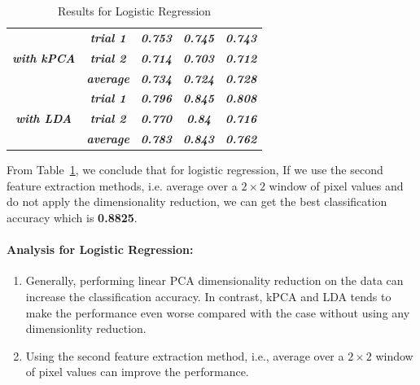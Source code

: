 \documentclass{article}
\begin{document}
\begin{table}[!htb]
\begin{tabular}{|c|c|ccc|}
\textit{\textbf{}}                                                                             & \textit{\textbf{trial 1}} & \multicolumn{1}{c|}{\textit{\textbf{0.753}}} & \multicolumn{1}{c|}{\textit{\textbf{0.745}}}  & \textit{\textbf{0.743}}  \\ \cline{2-5} 
\textit{\textbf{with kPCA}}                                                                    & \textit{\textbf{trial 2}} & \multicolumn{1}{c|}{\textit{\textbf{0.714}}} & \multicolumn{1}{c|}{\textit{\textbf{0.703}}}  & \textit{\textbf{0.712}}  \\ \cline{2-5} 
\textit{\textbf{}}                                                                             & \textit{\textbf{average}} & \multicolumn{1}{c|}{\textit{\textbf{0.734}}} & \multicolumn{1}{c|}{\textit{\textbf{0.724}}}  & \textit{\textbf{0.728}}  \\ \hline
\textit{\textbf{}}                                                                             & \textit{\textbf{trial 1}} & \multicolumn{1}{c|}{\textit{\textbf{0.796}}} & \multicolumn{1}{c|}{\textit{\textbf{0.845}}}  & \textit{\textbf{0.808}}  \\ \cline{2-5} 
\textit{\textbf{with LDA}}                                                                     & \textit{\textbf{trial 2}} & \multicolumn{1}{c|}{\textit{\textbf{0.770}}} & \multicolumn{1}{c|}{\textit{\textbf{0.84}}}   & \textit{\textbf{0.716}}  \\ \cline{2-5} 
\textit{\textbf{}}                                                                             & \textit{\textbf{average}} & \multicolumn{1}{c|}{\textit{\textbf{0.783}}} & \multicolumn{1}{c|}{\textit{\textbf{0.843}}}  & \textit{\textbf{0.762}}  \\ \hline
\end{tabular}
\caption{Results for Logistic Regression}
\label{logit_res}
\end{table}

From Table~\ref{logit_res}, we conclude that for logistic regression, If we use the second feature extraction methods, i.e. average over a $2 \times 2$ window of pixel values and do not apply the dimensionality reduction, we can get the best classification accuracy which is \textbf{0.8825}.

\paragraph{Analysis for Logistic Regression:}
\begin{enumerate}
    \item Generally, performing linear PCA dimensionality reduction on the data can increase the classification accuracy. In contrast, kPCA and LDA tends to make the performance even worse compared with the case without using any dimensionlity reduction.
    \item Using the second feature extraction method, i.e., average over a $2 \times 2$ window of pixel values can improve the performance.
\end{enumerate}
\end{document}

